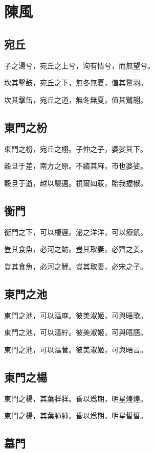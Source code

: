 \section[陳風]{陳風}

\subsection[宛丘]{宛丘}

子之湯兮，宛丘之上兮，洵有情兮，而無望兮。

坎其擊鼓，宛丘之下，無冬無夏，值其鷺羽。

坎其擊缶，宛丘之道，無冬無夏，值其鷺翿。

\subsection[東門之枌]{東門之枌}

東門之枌，宛丘之栩。子仲之子，婆娑其下。

穀旦于差，南方之原。不績其麻，市也婆娑。

穀旦于逝，越以鬷邁。視爾如荍，貽我握椒。

\subsection[衡門]{衡門}

衡門之下，可以棲遲。泌之洋洋，可以療飢。

豈其食魚，必河之魴。豈其取妻，必齊之姜。

豈其食魚，必河之鯉。豈其取妻，必宋之子。

\subsection[東門之池]{東門之池}

東門之池，可以漚麻。彼美淑姬，可與晤歌。

東門之池，可以漚紵。彼美淑姬，可與晤語。

東門之池，可以漚菅。彼美淑姬，可與晤言。

\subsection[東門之楊]{東門之楊}

東門之楊，其葉牂牂。昏以爲期，明星煌煌。

東門之楊，其葉肺肺。昏以爲期，明星晢晢。

\subsection[墓門]{墓門}

